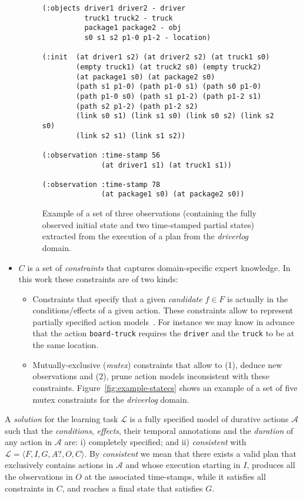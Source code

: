 \documentclass{ecai}
\newcommand{\tup}[1]{{\langle #1 \rangle}}
\begin{document}
\begin{itemize}
\begin{figure}[hbt!]
\begin{scriptsize}    
\begin{verbatim}
(:objects driver1 driver2 - driver
          truck1 truck2 - truck
          package1 package2 - obj
          s0 s1 s2 p1-0 p1-2 - location)

(:init	(at driver1 s2)	(at driver2 s2) (at truck1 s0)
        (empty truck1) (at truck2 s0) (empty truck2) 
        (at package1 s0) (at package2 s0)
        (path s1 p1-0) (path p1-0 s1) (path s0 p1-0) 
        (path p1-0 s0) (path s1 p1-2) (path p1-2 s1)
        (path s2 p1-2) (path p1-2 s2)
        (link s0 s1) (link s1 s0) (link s0 s2) (link s2 s0)
        (link s2 s1) (link s1 s2))

(:observation :time-stamp 56
              (at driver1 s1) (at truck1 s1))

(:observation :time-stamp 78
              (at package1 s0) (at package2 s0))
\end{verbatim}
\end{scriptsize}    
\caption{Example of a set of three observations (containing the fully observed initial state and two time-stamped partial states) extracted from the execution of a plan from the {\em driverlog} domain.}
\label{fig:exampleObservations}
\end{figure}  


\item $C$ is a set of {\em constraints} that captures domain-specific expert knowledge. In this work these constraints are of two kinds: 
\begin{itemize}
\item Constraints that specify that a given {\em candidate} $f\in F$ is actually in the conditions/effects of a given action. These constraints allow to represent partially specified action models~\cite{zhuo2013refining}. For instance we may know in advance that  the action {\tt board-truck} requires the {\tt driver} and the {\tt truck} to be at the same location. 
\item Mutually-exclusive ({\em mutex}) constraints that allow to (1), deduce new observations and (2), prune action models inconsistent with these constraints. Figure~\ref{fig:example-statecs} shows an example of a set of five mutex constraints for the {\em driverlog} domain. 
\end{itemize}
\end{itemize}

A {\em solution} for the learning task $\mathcal{L}$ is a fully specified model of durative actions $\mathcal{A}$ such that the {\em conditions}, {\em effects}, their temporal annotations and the {\em duration} of any action in $\mathcal{A}$ are: i) completely specified; and ii) {\em consistent} with $\mathcal{L}=\tup{F,I,G,A?,O,C}$. By {\em consistent} we mean that there exists a valid plan that exclusively contains actions in $\mathcal{A}$ and whose execution starting in $I$, produces all the observations in $O$ at the associated time-stamps, while it satisfies all constraints in $C$, and reaches a final state that satisfies $G$.
\end{document}
